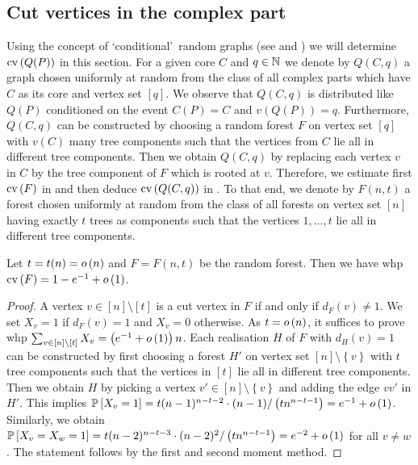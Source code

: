 \subsection{Cut vertices in the complex part}\label{sub:complex}
Using the concept of \lq conditional\rq\ random graphs (see  and ) we will determine $\operatorname{cv}\left(Q(P)\right)$ in this section. For a given core $C$ and $q\in\mathbb{N}$ we denote by $Q(C,q)$ a graph chosen uniformly at random from the class of all complex parts which have $C$ as its core and vertex set $[q]$. We observe that $Q(C,q)$ is distributed like $Q(P)$ conditioned on the event $C(P)=C$ and $v(Q(P))=q$. Furthermore, $Q(C,q)$ can be constructed by choosing a random forest $F$ on vertex set $[q]$ with $v(C)$ many tree components such that the vertices from $C$ lie all in different tree components. Then we obtain $Q(C,q)$ by replacing each vertex $v$ in $C$ by the tree component of $F$ which is rooted at $v$. Therefore, we estimate first $\operatorname{cv}\left(F\right)$ in  and then deduce $\operatorname{cv}\left(Q(C,q)\right)$ in . To that end, we denote by $F(n,t)$ a forest chosen uniformly at random from the class of all forests on vertex set $[n]$ having exactly $t$ trees as components such that the vertices $1, \ldots, t$ lie all in different tree components.
\begin{lem}\label{lem:cut_vertices_forest}
Let $t=t(n)=o\left(n\right)$ and $F=F(n,t)$ be the random forest. Then we have whp $\operatorname{cv}\left(F\right)=1-e^{-1}+o\left(1\right)$.
\end{lem}
\begin{proof}
A vertex $v\in[n]\setminus[t]$ is a cut vertex in $F$ if and only if $d_F(v)\neq 1$. We set $X_v=1$ if $d_F(v)= 1$ and $X_v=0$ otherwise. As $t=o\left(n\right)$, it suffices to prove whp $\sum_{v\in[n]\setminus[t]}X_v=\left(e^{-1}+o\left(1\right)\right)n$. Each realisation $H$ of $F$ with $d_H(v)=1$ can be constructed by first choosing a forest $H'$ on vertex set $[n]\setminus\left\{v\right\}$ with $t$ tree components such that the vertices in $[t]$ lie all in different tree components. Then we obtain $H$ by picking a vertex $v'\in [n]\setminus\left\{v\right\}$ and adding the edge $vv'$ in $H'$. This implies $\mathbb{P}\left[X_v=1\right]=t(n-1)^{n-t-2}\cdot(n-1)/\left(tn^{n-t-1}\right)=e^{-1}+o\left(1\right)$. Similarly, we obtain $\mathbb{P}\left[X_v=X_w=1\right]=t(n-2)^{n-t-3}\cdot(n-2)^2/\left(tn^{n-t-1}\right)=e^{-2}+o\left(1\right)$ for all $v\neq w$. The statement follows by the first and second moment method.
\end{proof}
	
